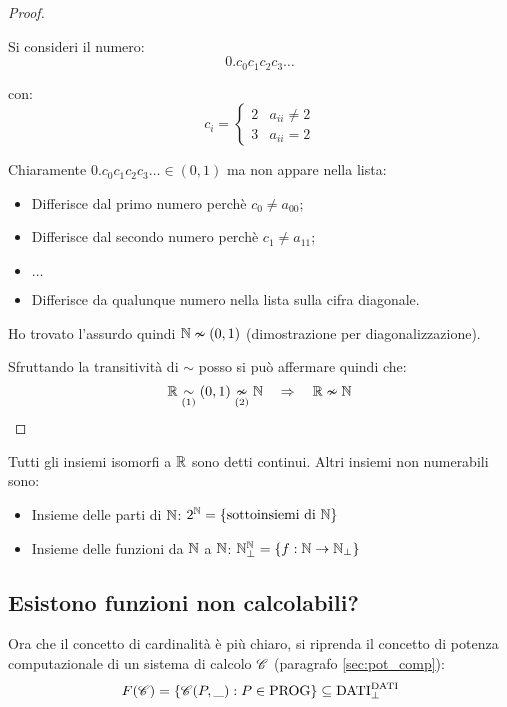 \begin{proof}
\begin{enumerate}
\begin{minipage}{.48\textwidth}
                Si consideri il numero:
                $$ 0.c_0c_1c_2c_3\dots $$

                con: $$ c_i = \begin{cases}
                2 & a_{ii}\neq2\\
                3 & a_{ii}=2
                \end{cases} $$

            \end{minipage}
            Chiaramente $0.c_0c_1c_2c_3\dots\in(0,1)$ ma non appare nella lista:
            \begin{itemize}
                \item Differisce dal primo numero perchè $c_0\neq a_{00}$;
                \item Differisce dal secondo numero perchè $c_1\neq a_{11}$;
                \item $\dots$
                \item Differisce da qualunque numero nella lista sulla cifra 
                    {\color{red} diagonale}.
            \end{itemize}
            Ho trovato l'assurdo quindi $\mathbb{N} \nsim (0,1)$ (dimostrazione per 
            diagonalizzazione).
    \end{enumerate}
    Sfruttando la transitività di $\sim$ posso si può affermare quindi che:
    $$ \mathbb{R} \underset{(1)}{\sim} (0,1) \underset{(2)}{\nsim} \mathbb{N} \quad \Rightarrow \quad \mathbb{R} \nsim \mathbb{N} $$
\end{proof}

Tutti gli insiemi isomorfi a $\mathbb{R}$ sono detti continui. Altri insiemi non numerabili sono:
\begin{itemize}
    \item Insieme delle parti di $\mathbb{N}$: $2^{\mathbb{N}} = \{\text{sottoinsiemi di } \mathbb{N}\}$
    \item Insieme delle funzioni da $\mathbb{N}$ a $\mathbb{N}$:
        $\mathbb{N}^{\mathbb{N}}_\perp = \{f:\mathbb{N}\rightarrow\mathbb{N}_\perp\}$
\end{itemize}

\subsection{Esistono funzioni non calcolabili?}
Ora che il concetto di cardinalità è più chiaro, si riprenda il concetto di 
potenza computazionale di un sistema di calcolo $\mathcal{C}$ (paragrafo \ref{sec:pot_comp}):
$$
F(\mathcal{C}) = \{\mathcal{C}(P,\_):P\in\text{PROG}\} \subseteq \text{DATI}^{\text{DATI}}_\perp
$$

